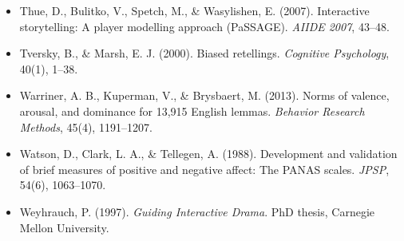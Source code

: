 \documentclass[11pt, a4paper]{article}
\begin{document}
\begin{itemize}
  \item Thue, D., Bulitko, V., Spetch, M., \& Wasylishen, E. (2007). Interactive storytelling: A player modelling approach (PaSSAGE). \textit{AIIDE 2007}, 43--48.
  \item Tversky, B., \& Marsh, E. J. (2000). Biased retellings. \textit{Cognitive Psychology}, 40(1), 1--38.
  \item Warriner, A. B., Kuperman, V., \& Brysbaert, M. (2013). Norms of valence, arousal, and dominance for 13,915 English lemmas. \textit{Behavior Research Methods}, 45(4), 1191--1207.
  \item Watson, D., Clark, L. A., \& Tellegen, A. (1988). Development and validation of brief measures of positive and negative affect: The PANAS scales. \textit{JPSP}, 54(6), 1063--1070.
  \item Weyhrauch, P. (1997). \textit{Guiding Interactive Drama}. PhD thesis, Carnegie Mellon University.
\end{itemize}
\end{document}
